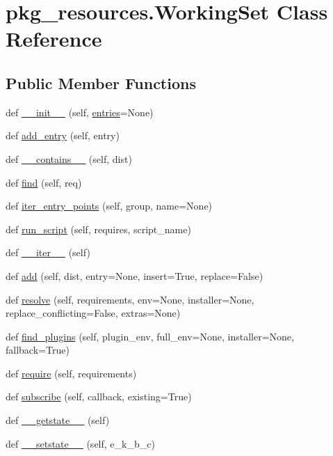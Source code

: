 \hypertarget{classpkg__resources_1_1WorkingSet}{}\section{pkg\+\_\+resources.\+Working\+Set Class Reference}
\label{classpkg__resources_1_1WorkingSet}
\subsection*{Public Member Functions}
\begin{DoxyCompactItemize}
\item 
def \hyperlink{classpkg__resources_1_1WorkingSet_a88df1aa3c1781fcb4576a56854bab8da}{\+\_\+\+\_\+init\+\_\+\+\_\+} (self, \hyperlink{classpkg__resources_1_1WorkingSet_aa9a6eb37900163d92183a1e40a0b52f4}{entries}=None)
\item 
def \hyperlink{classpkg__resources_1_1WorkingSet_aed20abcb6a85cdc25dff1686ad480958}{add\+\_\+entry} (self, entry)
\item 
def \hyperlink{classpkg__resources_1_1WorkingSet_a6a4880a5d32dac95a7b93f03f7ebc5b9}{\+\_\+\+\_\+contains\+\_\+\+\_\+} (self, dist)
\item 
def \hyperlink{classpkg__resources_1_1WorkingSet_a4eb8b69f25d05e0edb4f2a8d162d096b}{find} (self, req)
\item 
def \hyperlink{classpkg__resources_1_1WorkingSet_a556736951f3aa317fa2d339d64e290ea}{iter\+\_\+entry\+\_\+points} (self, group, name=None)
\item 
def \hyperlink{classpkg__resources_1_1WorkingSet_ab2b93a4b8818042f319d7f9d7d2884bf}{run\+\_\+script} (self, requires, script\+\_\+name)
\item 
def \hyperlink{classpkg__resources_1_1WorkingSet_a59bda285ab373ec1cc8b22b0e24c460c}{\+\_\+\+\_\+iter\+\_\+\+\_\+} (self)
\item 
def \hyperlink{classpkg__resources_1_1WorkingSet_ab12bd19b39a01d6013544ab543401a16}{add} (self, dist, entry=None, insert=True, replace=False)
\item 
def \hyperlink{classpkg__resources_1_1WorkingSet_a38c13850cc73d319b4bcf47592132941}{resolve} (self, requirements, env=None, installer=None, replace\+\_\+conflicting=False, extras=None)
\item 
def \hyperlink{classpkg__resources_1_1WorkingSet_a5a8cbb91286691870d04edd6c841197d}{find\+\_\+plugins} (self, plugin\+\_\+env, full\+\_\+env=None, installer=None, fallback=True)
\item 
def \hyperlink{classpkg__resources_1_1WorkingSet_a1c2434f098e08c20314935fddad8426b}{require} (self, requirements)
\item 
def \hyperlink{classpkg__resources_1_1WorkingSet_a998b3678540dc5f39aa560f347c66d4b}{subscribe} (self, callback, existing=True)
\item 
def \hyperlink{classpkg__resources_1_1WorkingSet_a576c93da9ba579531e1c0144dc83769b}{\+\_\+\+\_\+getstate\+\_\+\+\_\+} (self)
\item 
def \hyperlink{classpkg__resources_1_1WorkingSet_ae0f044870f29ce1c4fd06ebaa209cc51}{\+\_\+\+\_\+setstate\+\_\+\+\_\+} (self, e\+\_\+k\+\_\+b\+\_\+c)
\end{DoxyCompactItemize}
